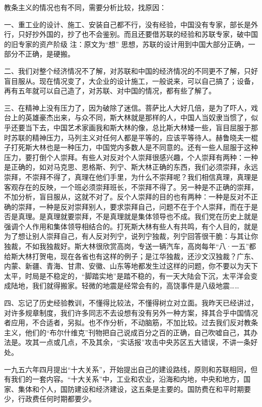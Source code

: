 教条主义的情况也有不同，需要分析比较，找原因：

一、重工业的设计、施工、安装自己都不行，没有经验，中国没有专家，部长是外行，只好抄外国的，抄了也不会鉴别。而且还要借苏联的经验和苏联专家，破中国的旧专家的资产阶级 注：原文为“想” 思想，苏联的设计用到中国大部分正确，一部分不正确，是硬搬。

二、我们对整个经济情况不了解，对苏联和中国的经济情况的不同更不了解，只好盲目服从。现在情况变了，大企业的设计施工，一般说来，可以自己搞了；设备，再有五年就可以自己造了，对苏联、对中国的情况，都有些了解了。

三、在精神上没有压力了，因为破除了迷信。菩萨比人大好几倍，是为了吓人，戏台上的英雄豪杰出来，与众不同，斯大林就是那样的人，中国人当奴隶当惯了，似乎还要当下去，中国艺术家画我和斯大林的像，总比斯大林矮一些，盲目屈服于那时苏联的精神压力，马列主义对任何人都是平等的，应该平等待人。赫鲁晓夫一棍子打死斯大林也是一种压力，中国党内多数人是不同意的。还有一些人屈服于这种压力，要打倒个人崇拜。有些人对反对个人崇拜很感兴趣，个人崇拜有两种：一种是正确的，如对马克思、恩格斯、列宁、斯大林正确的东西，我们必须崇拜，永远崇拜，不崇拜不得了，真理在他们手里，为什么不崇拜呢？我们相信真理，真理是客观存在的反映，一个班必须崇拜班长，不崇拜不得了。另一种是不正确的崇拜，不加分析，盲目服从，这就不对了。反个人崇拜的目的也有两种：一种是反对不正确的崇拜，一种是反对崇拜别人，要求崇拜自己，问题不在于个人崇拜，而在于是否是真理。是真理就要崇拜，不是真理就是集体领导也不成。我们党在历史上就是强调个人作用和集体领导相结合的。打死斯大林有些人有共鸣，有个人目的，就是为了想让别人崇拜自己，有人反对列宁，说列宁独裁，列宁回答很干脆：与其让你独裁，不如我独裁好。斯大林很欣赏高岗，专送一辆汽车，高岗每年“八·一五”都给斯大林打贺电，现在各省也有这样的例子；是江华独裁，还沙文汉独裁？广东、内蒙、新疆、青海、甘肃、安徽、山东等地都发生过这样的问题，你不要以为天下太平，时局是不稳定的，“脚踏实地”是踏不稳的，有一天大陆会下沉，太平洋会变成陆地，我们就得搬家。轻微的地震是经常会有的，高饶事件是八级地震……

四、忘记了历史经验教训，不懂得比较法，不懂得树立对立面。我昨天已经讲过，对许多规章制度，我们许多同志不去设想有没有另外一种方案，择其合乎中国情况者应用，不合适者，另拟。也不作分析，不动脑筋，不加比较。过去我们反对教条主义，他们的“布尔什维克”刊物把自己说成百分之百的正确，自己吹嘘自己，其办法是。攻其一点或几点，不及其余，“实话报”攻击中央苏区五大错误，不讲一条好处。

一九五六年四月提出“十大关系”，开始提出自己的建设路线，原则和苏联相同，但有我们的一套内容。“十大关系”中，工业和农业，沿海和内地，中央和地方，国家、集体和个人，国防建设和经济建设，这五条是主要的。国防费在和平时期要少，行政费任何时期都要少。

